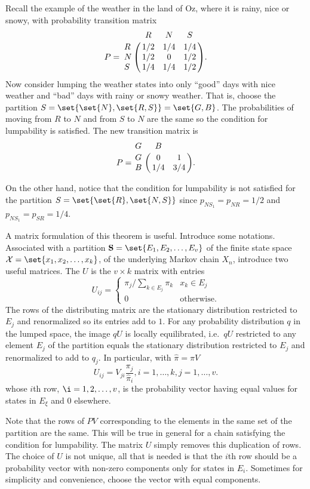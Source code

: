 \documentclass[12pt]{article}
\begin{document}
\begin{example}
    Recall the example of the weather in the land of Oz, where it is
    rainy, nice or snowy, with probability transition matrix
    \[
        P = \bordermatrix{ & R & N & S \cr
        R & 1/2 & 1/4 & 1/4 \cr
        N & 1/2 & 0 & 1/2 \cr
        S & 1/4 & 1/4 & 1/2 }.
    \] Now consider lumping the weather states into only ``good'' days
    with nice weather and ``bad'' days with rainy or snowy weather.
    That is, choose the partition \( S = \set{ \set{N}, \set{R,S}} =
    \set{G, B} \). The probabilities of moving from \( R \) to \( N \)
    and from \( S \) to \( N \) are the same so the condition for
    lumpability is satisfied.  The new transition matrix is
    \[
        P = \bordermatrix{ G & B \cr
        G & 0 & 1 \cr
        B & 1/4 & 3/4}.
    \]

    On the other hand, notice that the condition for lumpability is not
    satisfied for the partition \( S = \set{ \set{R}, \set{N, S}} \)
    since \( p_{N S_1} = p_{NR} = 1/2 \) and \( p_{N S_1} = p_{SR} = 1/4
    \).
\end{example}

A matrix formulation of this theorem is useful. Introduce some
notations. Associated with a partition \( \mathbf{S} = \set{E_1, E_2,
\dots, E_v} \) of the finite state space \( \mathcal{X} = \set{x_1, x_2,
\dots, x_k} \), of the underlying Markov chain \( X_n \), introduce two
useful matrices.  The %
\( U \) is the \( v \times k \) matrix with entries
\[
    U_{ij} =
    \begin{cases}
        \pi_j/\sum_{k \in E_j} \pi_k & x_k \in E_j \\
        0 & \text{otherwise}.
    \end{cases}
\] The rows of the distributing matrix are the stationary distribution
restricted to \( E_j \) and renormalized so its entries add to \( 1 \).
For any probability distribution \( q \) in the lumped space, the image \(
qU \) is locally equilibrated, i.e.\ \( qU \) restricted to any element \(
E_j \) of the partition equals the stationary distribution restricted to
\( E_j \) and renormalized to add to \( q_j \).  In particular, with \(
\hat{\pi} = \pi V \)
\[
    U_{ij} = V_{ji} \frac{\pi_j}{\hat{\pi}_{i}}, i = 1, \dots, k, j = 1,
    \dots, v.
\] whose \( i \)th row, \( \i = 1, 2, \dots, v \), is the probability
vector having equal values for states in \( E_{\xi} \) and \( 0 \)
elsewhere.

Note that the rows of \( PV \) corresponding to the elements in the same
set of the partition are the same.  This will be true in general for a
chain satisfying the condition for lumpability.  The matrix \( U \)
simply removes this duplication of rows.  The choice of \( U \) is not
unique, all that is needed is that the \( i \)th row should be a
probability vector with non-zero components only for states in \( E_i \).
Sometimes for simplicity and convenience, choose the vector with equal
components.
\end{document}
